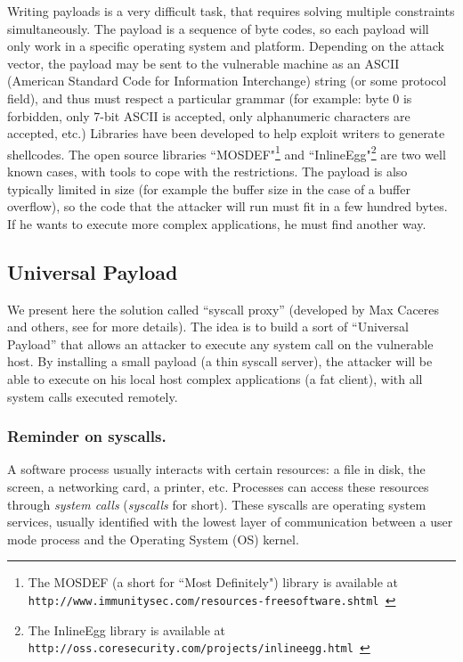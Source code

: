 \documentclass{llncs}
\begin{document}
Writing payloads is a very difficult task, that requires solving multiple constraints simultaneously.
The payload is a sequence of byte codes, so each payload will only work in 
a specific operating system and platform.
Depending on the attack vector, the payload may be sent to the vulnerable machine
as an ASCII (American Standard Code for Information Interchange) string (or some protocol field), 
and thus must respect a particular grammar
(for example: byte 0 is forbidden, only 7-bit ASCII is accepted, only alphanumeric characters are accepted, etc.)
Libraries have been developed to help exploit writers to generate shellcodes.
The open source libraries ``MOSDEF"\footnote{The MOSDEF (a short for ``Most Definitely") library is available at\\ 
{\tt http://www.immunitysec.com/resources-freesoftware.shtml }}
and ``InlineEgg"\footnote{The InlineEgg library is available at\\ 
{\tt http://oss.coresecurity.com/projects/inlineegg.html }}
are two well known cases, with tools to cope with the restrictions.
The payload is also typically limited in size (for example the buffer size in the case of a buffer overflow),
so the code that the attacker will run must fit in a few hundred bytes.
 If he wants to execute more complex applications, 
he must find another way.

\subsection{Universal Payload}

We present here the solution called ``syscall proxy'' (developed by Max Caceres and others, see \cite{proxycall} for more details).
The idea is to build a sort of ``Universal Payload'' that allows an attacker
to execute any system call on the vulnerable host.
By installing a small payload (a thin syscall server),
the attacker will be able to execute on his local host complex applications (a fat client),
with all system calls executed remotely.


\subsubsection{Reminder on syscalls.}

A software process usually interacts with certain resources: a file in disk, the screen, a
networking card, a printer, etc. Processes can access these resources 
through \emph{system calls} (\emph{syscalls} for short). These
syscalls are operating system services, usually identified with the lowest layer of communication between a user mode
process and the Operating System (OS) kernel.
\end{document}
